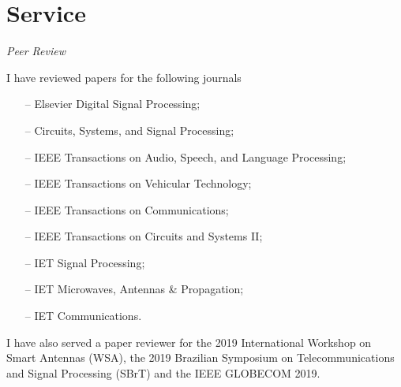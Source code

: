 \section{Service} 

{\sl Peer Review}

I have reviewed papers for the following journals
\begin{itemize}
	\item[--] Elsevier Digital Signal Processing;
	\item[--] Circuits, Systems, and Signal Processing;
	\item[--] IEEE Transactions on Audio, Speech, and Language Processing;
	\item[--] IEEE Transactions on Vehicular Technology;
	\item[--] IEEE Transactions on Communications;
	\item[--] IEEE Transactions on Circuits and Systems II;
	\item[--] IET Signal Processing;
	\item[--] IET Microwaves, Antennas \& Propagation;
	\item[--] IET Communications.
\end{itemize}
I have also served a paper reviewer for the 2019 International Workshop on Smart Antennas (WSA), the 2019 Brazilian Symposium on Telecommunications and Signal Processing (SBrT) and the IEEE GLOBECOM 2019.